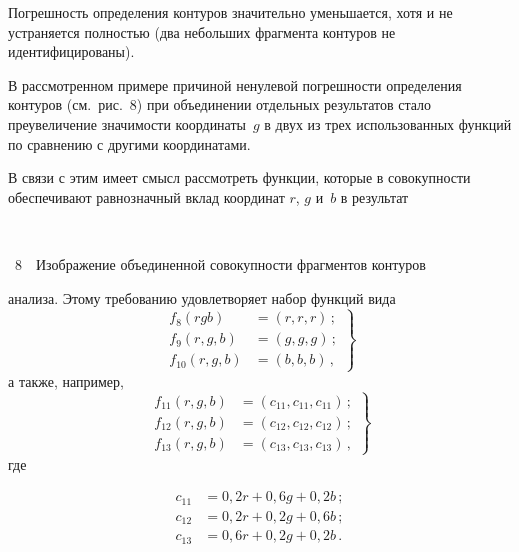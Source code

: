 \begin{multicols}{2}
  Погрешность определения контуров значительно уменьшается, хотя и не
устраняется полностью (два небольших фрагмента контуров не
идентифицированы).

  В рассмотренном примере причиной ненулевой погрешности определения
контуров (см.\ рис.~8) при объединении отдельных результатов стало
преувеличение значимости координаты~$g$ в двух из трех использованных
функций по сравнению с другими координатами.




  В связи с этим имеет смысл рассмотреть функции, которые в совокупности
обеспечивают равнозначный вклад координат $r$, $g$ и~$b$ в результат\linebreak\vspace*{-12pt}
\begin{center}  %
\vspace*{9pt}
\mbox{%
\epsfxsize=78mm
}
\end{center}
  \vspace*{2pt}

\noindent
{{\figurename~8}\ \ \small{Изображение объединенной совокупности фрагментов контуров}}


\addtocounter{figure}{1}


\noindent
анализа. Этому требованию удовлетворяет набор функций вида
  \begin{equation}
  \left.
  \begin{array}{rl}
  f_8 (rgb) &=(r,r,r)\,;\\[6pt]
  f_9(r,g,b) &= (g,g,g)\,;\\[6pt]
  f_{10}(r,g,b) &= (b,b,b)\,,
  \end{array}
  \right\}
  \label{e2-zyk}
  \end{equation}
а также, например,
\noindent
\begin{equation}
\left.
\begin{array}{rl}
f_{11}(r,g,b) &=(c_{11}, c_{11}, c_{11})\,; \\[6pt]
f_{12}(r,g,b) &=(c_{12}, c_{12}, c_{12})\,; \\[6pt]
f_{13}(r,g,b) &=(c_{13}, c_{13}, c_{13})\,,
\end{array}
\right\}
\label{e3-zyk}
\end{equation}
где

\noindent
\begin{align*}
c_{11}&=0{,}2r+0{,}6g+0{,}2b\,;\\
c_{12}&=0{,}2r+0{,}2g+0{,}6b\,;\\
c_{13}&=0{,}6r+0{,}2g+0{,}2b\,.
\end{align*}


\end{multicols}
